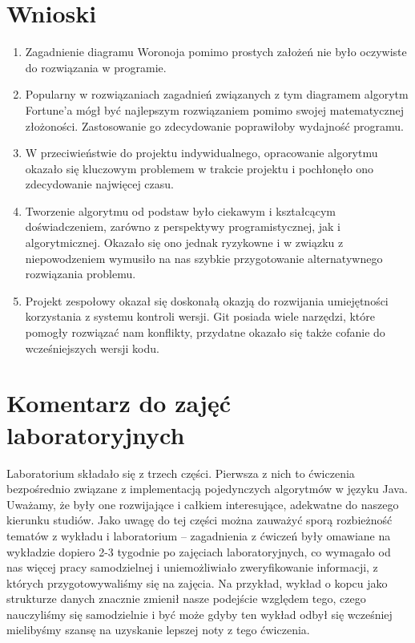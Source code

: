 \documentclass[a4paper,12pt]{article}
\newcommand\tab[1][0.6cm]{\hspace*{#1}}
\begin{document}
\section{Wnioski}

\begin{enumerate}

\item Zagadnienie diagramu Woronoja pomimo prostych założeń nie było oczywiste do rozwiązania w programie.

\item Popularny w rozwiązaniach zagadnień związanych z tym diagramem algorytm Fortune'a mógł być najlepszym rozwiązaniem pomimo swojej matematycznej złożoności. Zastosowanie go zdecydowanie poprawiłoby wydajność programu.

\item W przeciwieństwie do projektu indywidualnego, opracowanie algorytmu okazało się kluczowym problemem w trakcie projektu i pochłonęło ono zdecydowanie najwięcej czasu.

\item Tworzenie algorytmu od podstaw było ciekawym i kształcącym doświadczeniem, zarówno z perspektywy programistycznej, jak i algorytmicznej. Okazało się ono jednak ryzykowne i w związku z niepowodzeniem wymusiło na nas szybkie przygotowanie alternatywnego rozwiązania problemu.

\item Projekt zespołowy okazał się doskonałą okazją do rozwijania umiejętności korzystania z systemu kontroli wersji. Git posiada wiele narzędzi, które pomogły rozwiązać nam konflikty, przydatne okazało się także cofanie do wcześniejszych wersji kodu.

\end{enumerate}


\section{Komentarz do zajęć laboratoryjnych}

\tab Laboratorium składało się z trzech części. Pierwsza z nich to ćwiczenia bezpośrednio związane z implementacją pojedynczych algorytmów w języku Java. Uważamy, że były one rozwijające i całkiem interesujące, adekwatne do naszego kierunku studiów. Jako uwagę do tej części można zauważyć sporą rozbieżność tematów z wykładu i laboratorium -- zagadnienia z ćwiczeń były omawiane na wykładzie dopiero 2-3 tygodnie po zajęciach laboratoryjnych, co wymagało od nas więcej pracy samodzielnej i uniemożliwiało zweryfikowanie informacji, z których przygotowywaliśmy się na zajęcia. Na przykład, wykład o kopcu jako strukturze danych znacznie zmienił nasze podejście względem tego, czego nauczyliśmy się samodzielnie i być może gdyby ten wykład odbył się wcześniej mielibyśmy szansę na uzyskanie lepszej noty z tego ćwiczenia.
\end{document}
